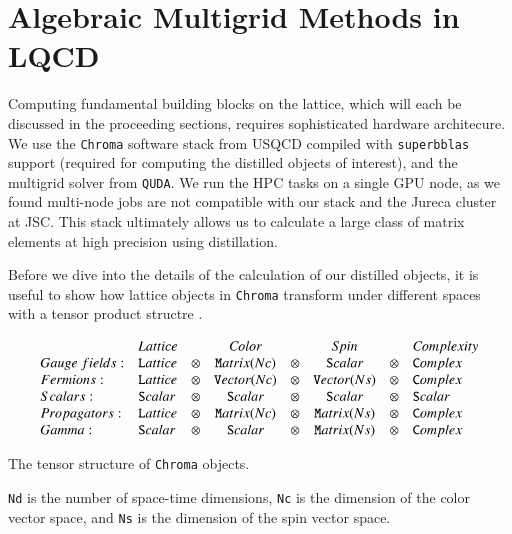 \section{Algebraic Multigrid Methods in LQCD}
Computing fundamental building blocks on the lattice, which will each be discussed in the proceeding sections, requires sophisticated hardware architecure. We use the \verb|Chroma| software stack from USQCD \cite{Edwards_2005} compiled with \verb|superbblas| support (required for computing the distilled objects of interest), and the multigrid solver from \verb|QUDA|. We run the HPC tasks on a single GPU node, as we found multi-node jobs are not compatible with our stack and the Jureca cluster at JSC. This stack ultimately allows us to calculate a large class of matrix elements at high precision \cite{romero_efficient_2020} using distillation. 

Before we dive into the details of the calculation of our distilled objects, it is useful to show how lattice objects in \texttt{Chroma} transform under different spaces with a tensor product structre \cite{Edwards_2005}. 
\begin{table}
\begin{displaymath}
  \begin{array}{llcccccl}
                    & {\textit Lattice} &    &  {\textit Color} &     & {\textit Spin}  &     & {\textit Complexity}\\
  {Gauge\ fields:}& {\texttt Lattice} &\otimes& {\texttt Matrix(Nc)}&\otimes& {\texttt Scalar}    &\otimes& {\texttt Complex}\\
  {Fermions:}    & {\texttt Lattice} &\otimes& {\texttt Vector(Nc)}&\otimes& {\texttt Vector(Ns)}&\otimes& {\texttt Complex}\\
  {Scalars:}     & {\texttt Scalar}  &\otimes& {\texttt Scalar}    &\otimes& {\texttt Scalar}    &\otimes& {\texttt Scalar} \\
  {Propagators:} & {\texttt Lattice} &\otimes& {\texttt Matrix(Nc)}&\otimes& {\texttt Matrix(Ns)}&\otimes& {\texttt Complex}\\
  {Gamma:}       & {\texttt Scalar}  &\otimes& {\texttt Scalar}    &\otimes& {\texttt Matrix(Ns)}&\otimes& {\texttt Complex}\\
  \end{array}
  \end{displaymath}
  \caption{The tensor structure of \texttt{Chroma} objects.}
    \label{fig:chroma}
\end{table}

\verb|Nd| is the number of space-time dimensions, \verb|Nc| is the dimension of the color vector space, and \verb|Ns| is the dimension of the spin vector space.
  
